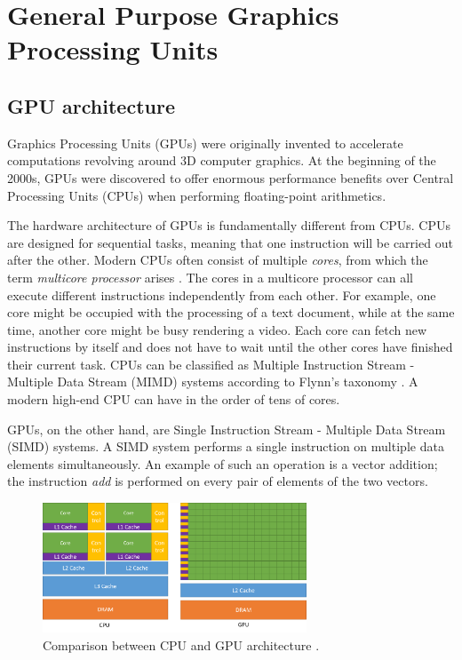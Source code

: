 \chapter{General Purpose Graphics Processing Units}

\section{GPU architecture}
Graphics Processing Units (GPUs) were originally invented to accelerate computations revolving around 3D computer graphics. At the beginning of the 2000s, GPUs were discovered to offer enormous performance benefits over Central Processing Units (CPUs) when performing floating-point arithmetics. 

The hardware architecture of GPUs is fundamentally different from CPUs. CPUs are designed for sequential tasks, meaning that one instruction will be carried out after the other. Modern CPUs often consist of multiple \emph{cores}, from which the term \emph{multicore processor} arises \citep{hennessyComputerArchitectureQuantitative2012}. The cores in a multicore processor can all execute different instructions independently from each other. For example, one core might be occupied with the processing of a text document, while at the same time, another core might be busy rendering a video. Each core can fetch new instructions by itself and does not have to wait until the other cores have finished their current task. CPUs can be classified as Multiple Instruction Stream - Multiple Data Stream (MIMD) systems according to Flynn's taxonomy \citep{flynnVeryHighspeedComputing1966}. A modern high-end CPU can have in the order of tens of cores.

GPUs, on the other hand, are Single Instruction Stream - Multiple Data Stream (SIMD) systems. A SIMD system performs a single instruction on multiple data elements simultaneously. An example of such an operation is a vector addition; the instruction \emph{add} is performed on every pair of elements of the two vectors.

\begin{figure}[H]
    \centering
    \includegraphics[width=0.7\textwidth]{../images/cpu-vs-gpu-diagram.png}
    \caption{Comparison between CPU and GPU architecture \citep{nvidiaCUDAProgrammingGuide2023}.}
    \label{fig:cpu-vs-gpu-diagram}
\end{figure}

